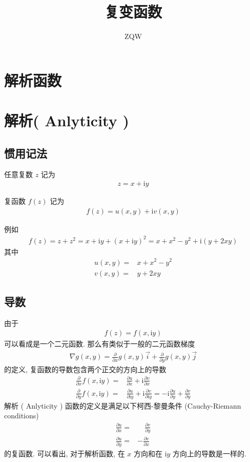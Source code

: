 \documentclass{ctexart}
\title{复变函数}
\author{ZQW}
\begin{document}
\maketitle

\section{解析函数}
\section{解析( Anlyticity )}

\subsection{惯用记法}

任意复数 $z$ 记为
\begin{align*}
  z = x + \mathrm{i}y
\end{align*}

复函数 $f(z)$ 记为
\begin{align*}
  f(z) = u(x,y) +\mathrm{i} v(x,y)
\end{align*}

例如
\begin{align*}
  f(z) = z + z^2 = x + \mathrm{i}y + (x + \mathrm{i}y)^2 = x + x^2 - y^2 + \mathrm{i}(y + 2xy)
\end{align*}
其中
\begin{align*}
  u(x,y) =& x + x^2 - y^2 \\
  v(x,y) =& y + 2xy
\end{align*}

\subsection{导数}

由于
\begin{align*}
  f(z) = f(x,\mathrm{i}y)
\end{align*}
可以看成是一个二元函数.
那么有类似于一般的二元函数梯度
\begin{align*}
  \nabla g(x,y) = \frac{\partial}{\partial x} g(x,y) \vec{i}+ \frac{\partial}{\partial y} g(x,y) \vec{j}
\end{align*}
的定义, 复函数的导数包含两个正交的方向上的导数
\begin{align*}
  \frac{\partial}{\partial x} f(x,\mathrm{i}y) =&\frac{\partial u}{\partial x} + \mathrm{i}\frac{\partial v}{\partial x}\\
  \frac{\partial}{\partial y} f(x,\mathrm{i}y) =&\frac{\partial u}{\partial \mathrm{i}y} + \mathrm{i} \frac{\partial v}{\partial \mathrm{i}y}
                                               =- \mathrm{i}\frac{\partial u}{\partial y} +\frac{\partial v}{\partial y}
\end{align*}
解析 ( Anlyticity ) 函数的定义是满足以下柯西-黎曼条件 (Cauchy-Riemann conditions)
\begin{align*}
  \frac{\partial u}{\partial x} =&\quad \frac{\partial v}{\partial y} \\
  \frac{\partial u}{\partial y} =& -\frac{\partial v}{\partial x}
\end{align*}
的复函数. 可以看出, 对于解析函数, 在 $x$ 方向和在 $\mathrm{i}y$ 方向上的导数是一样的.
\end{document}

